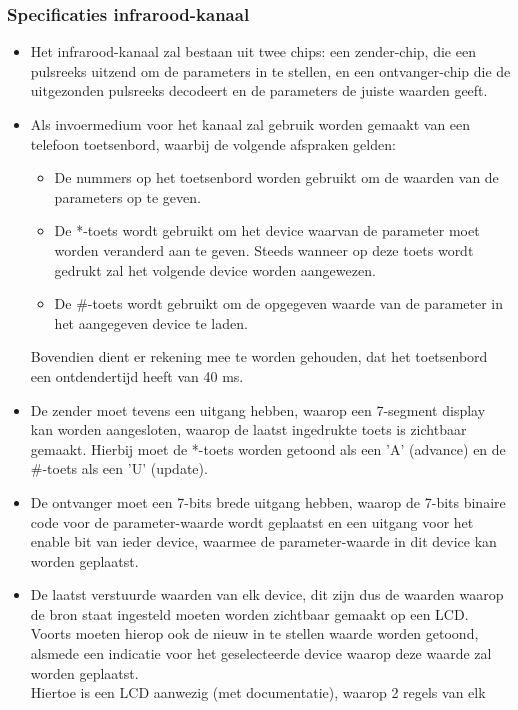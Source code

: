 \subsubsection{Specificaties infrarood-kanaal}
\begin{itemize}
\item Het infrarood-kanaal zal bestaan uit twee chips: een zender-chip,
      die een pulsreeks uitzend om de parameters in te stellen, en een
      ontvanger-chip die de uitgezonden pulsreeks decodeert en de
      parameters de juiste waarden geeft.
\item Als invoermedium voor het kanaal zal gebruik worden gemaakt van een
      telefoon toetsenbord, waarbij de volgende afspraken gelden:
      \begin{itemize}
      \item De nummers op het toetsenbord worden gebruikt om de waarden van
            de parameters op te geven.
      \item De *-toets wordt gebruikt om het device waarvan de parameter
            moet worden veranderd aan te geven. Steeds wanneer op deze
            toets wordt gedrukt zal het volgende device worden aangewezen.
      \item De \#-toets wordt gebruikt om de opgegeven waarde van de parameter
            in het aangegeven device te laden.
      \end{itemize}
      Bovendien dient er rekening mee te worden gehouden, dat het toetsenbord
      een ontdendertijd heeft van 40 ms.
\item De zender moet tevens een uitgang hebben, waarop een 7-segment display
      kan worden aangesloten, waarop de laatst ingedrukte toets is zichtbaar
      gemaakt. Hierbij moet de *-toets worden getoond als een 'A' (advance) en
      de \#-toets als een 'U' (update).
\item De ontvanger moet een 7-bits brede uitgang hebben,
      waarop de 7-bits binaire code
      voor de parameter-waarde wordt geplaatst en een uitgang voor het
      enable bit van ieder device, waarmee de parameter-waarde in dit device
      kan worden geplaatst.
\item De laatst verstuurde waarden van elk device, dit zijn dus de waarden
      waarop de bron staat ingesteld moeten worden zichtbaar gemaakt op een
      LCD. Voorts moeten hierop ook de nieuw in te stellen waarde worden
      getoond, alsmede een indicatie voor het geselecteerde device waarop
      deze waarde zal worden geplaatst.\\
      Hiertoe is een LCD aanwezig (met documentatie), waarop  2 regels van elk

\end{itemize}

